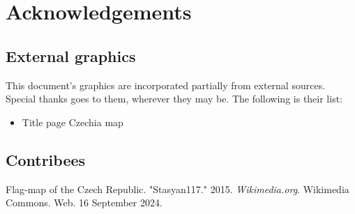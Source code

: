 \documentclass[12pt, oneside]{article}
\begin{document}
\newpage
\section{Acknowledgements}
\label{sec:ack}

\subsection{External graphics}

This document's graphics are incorporated partially from external sources. Special thanks goes to them, wherever they may be. The following is their list:

\begin{itemize}
  \item Title page Czechia map\cite{gr1}
\end{itemize}

\subsection{Contribees}


%
%

\newpage

\begin{thebibliography}{e}
Flag-map of the Czech Republic. "Stasyan117." 2015. \textit{Wikimedia.org}. Wikimedia Commons. Web. 16 September 2024.


\end{thebibliography}
\end{document}
